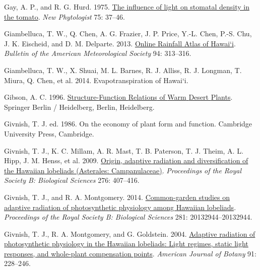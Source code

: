 \documentclass[
  letterpaper,
  DIV=11,
  numbers=noendperiod]{scrartcl}
\newlength{\cslhangindent}
\newlength{\cslentryspacingunit} %
\newenvironment{CSLReferences}[2] %
 {%
  \setlength{\parindent}{0pt}
  \ifodd #1
  \let\oldpar\par
  \def\par{\hangindent=\cslhangindent\oldpar}
  \fi
  \setlength{\parskip}{#2\cslentryspacingunit}
 }%
 {}
\begin{document}
\begin{CSLReferences}{1}{0}
\leavevmode{}%
Gay, A. P., and R. G. Hurd. 1975.
\href{https://doi.org/10.1111/j.1469-8137.1975.tb01368.x}{The influence
of light on stomatal density in the tomato}. \emph{New Phytologist} 75:
37--46.

\leavevmode{}%
Giambelluca, T. W., Q. Chen, A. G. Frazier, J. P. Price, Y.-L. Chen,
P.-S. Chu, J. K. Eischeid, and D. M. Delparte. 2013.
\href{https://doi.org/10.1175/BAMS-D-11-00228.1}{Online {Rainfall}
{Atlas} of {Hawai}`i}. \emph{Bulletin of the American Meteorological
Society} 94: 313--316.

\leavevmode{}%
Giambelluca, T. W., X. Shuai, M. L. Barnes, R. J. Alliss, R. J. Longman,
T. Miura, Q. Chen, et al. 2014. Evapotranspiration of {Hawai}`i.

\leavevmode{}%
Gibson, A. C. 1996.
\href{http://public.eblib.com/choice/PublicFullRecord.aspx?p=6495247}{Structure-{Function}
{Relations} of {Warm} {Desert} {Plants}}. Springer Berlin / Heidelberg,
Berlin, Heidelberg.

\leavevmode{}%
Givnish, T. J. ed. 1986. On the economy of plant form and function.
Cambridge University Press, Cambridge.

\leavevmode{}%
Givnish, T. J., K. C. Millam, A. R. Mast, T. B. Paterson, T. J. Theim,
A. L. Hipp, J. M. Henss, et al. 2009.
\href{https://doi.org/10.1098/rspb.2008.1204}{Origin, adaptive radiation
and diversification of the {Hawaiian} lobeliads ({Asterales}:
{Campanulaceae})}. \emph{Proceedings of the Royal Society B: Biological
Sciences} 276: 407--416.

\leavevmode{}%
Givnish, T. J., and R. A. Montgomery. 2014.
\href{https://doi.org/10.1098/rspb.2013.2944}{Common-garden studies on
adaptive radiation of photosynthetic physiology among {Hawaiian}
lobeliads}. \emph{Proceedings of the Royal Society B: Biological
Sciences} 281: 20132944--20132944.

\leavevmode{}%
Givnish, T. J., R. A. Montgomery, and G. Goldstein. 2004.
\href{https://doi.org/10.3732/ajb.91.2.228}{Adaptive radiation of
photosynthetic physiology in the {Hawaiian} lobeliads: Light regimes,
static light responses, and whole-plant compensation points}.
\emph{American Journal of Botany} 91: 228--246.


\end{CSLReferences}
\end{document}
